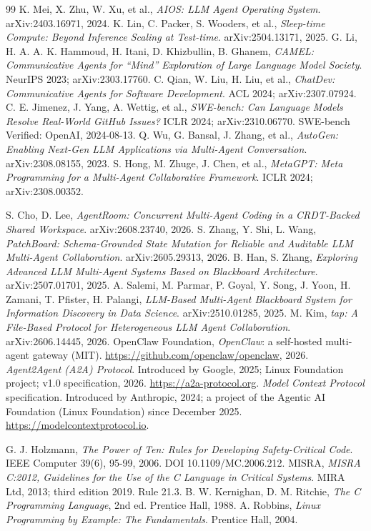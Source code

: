 \documentclass[11pt]{article}
\begin{document}
\begin{thebibliography}{99}
 K. Mei, X. Zhu, W. Xu, et al., \emph{AIOS: LLM Agent Operating System}. arXiv:2403.16971, 2024.
 K. Lin, C. Packer, S. Wooders, et al., \emph{Sleep-time Compute: Beyond Inference Scaling at Test-time}. arXiv:2504.13171, 2025.
 G. Li, H. A. A. K. Hammoud, H. Itani, D. Khizbullin, B. Ghanem, \emph{CAMEL: Communicative Agents for ``Mind'' Exploration of Large Language Model Society}. NeurIPS 2023; arXiv:2303.17760.
 C. Qian, W. Liu, H. Liu, et al., \emph{ChatDev: Communicative Agents for Software Development}. ACL 2024; arXiv:2307.07924.
 C. E. Jimenez, J. Yang, A. Wettig, et al., \emph{SWE-bench: Can Language Models Resolve Real-World GitHub Issues?} ICLR 2024; arXiv:2310.06770. SWE-bench Verified: OpenAI, 2024-08-13.
 Q. Wu, G. Bansal, J. Zhang, et al., \emph{AutoGen: Enabling Next-Gen LLM Applications via Multi-Agent Conversation}. arXiv:2308.08155, 2023.
 S. Hong, M. Zhuge, J. Chen, et al., \emph{MetaGPT: Meta Programming for a Multi-Agent Collaborative Framework}. ICLR 2024; arXiv:2308.00352.

 S. Cho, D. Lee, \emph{AgentRoom: Concurrent Multi-Agent Coding in a CRDT-Backed Shared Workspace}. arXiv:2608.23740, 2026.
 S. Zhang, Y. Shi, L. Wang, \emph{PatchBoard: Schema-Grounded State Mutation for Reliable and Auditable LLM Multi-Agent Collaboration}. arXiv:2605.29313, 2026.
 B. Han, S. Zhang, \emph{Exploring Advanced LLM Multi-Agent Systems Based on Blackboard Architecture}. arXiv:2507.01701, 2025.
 A. Salemi, M. Parmar, P. Goyal, Y. Song, J. Yoon, H. Zamani, T. Pfister, H. Palangi, \emph{LLM-Based Multi-Agent Blackboard System for Information Discovery in Data Science}. arXiv:2510.01285, 2025.
 M. Kim, \emph{tap: A File-Based Protocol for Heterogeneous LLM Agent Collaboration}. arXiv:2606.14445, 2026.
 OpenClaw Foundation, \emph{OpenClaw}: a self-hosted multi-agent gateway (MIT). \url{https://github.com/openclaw/openclaw}, 2026.
 \emph{Agent2Agent (A2A) Protocol}. Introduced by Google, 2025; Linux Foundation project; v1.0 specification, 2026. \url{https://a2a-protocol.org}.
 \emph{Model Context Protocol} specification. Introduced by Anthropic, 2024; a project of the Agentic AI Foundation (Linux Foundation) since December 2025. \url{https://modelcontextprotocol.io}.

 G. J. Holzmann, \emph{The Power of Ten: Rules for Developing Safety-Critical Code}. IEEE Computer 39(6), 95-99, 2006. DOI 10.1109/MC.2006.212.
 MISRA, \emph{MISRA C:2012, Guidelines for the Use of the C Language in Critical Systems}. MIRA Ltd, 2013; third edition 2019. Rule 21.3.
 B. W. Kernighan, D. M. Ritchie, \emph{The C Programming Language}, 2nd ed. Prentice Hall, 1988.
 A. Robbins, \emph{Linux Programming by Example: The Fundamentals}. Prentice Hall, 2004.

\end{thebibliography}
\end{document}
